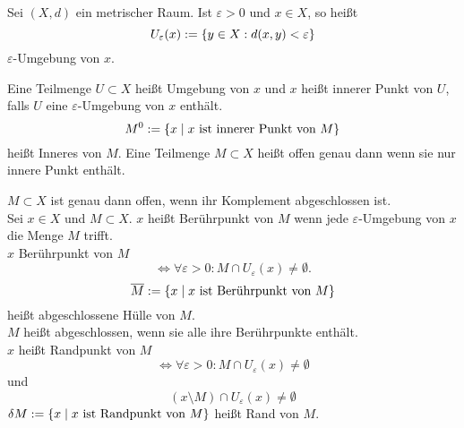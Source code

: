 \documentclass[../ana2u.tex]{subfiles}
\begin{document}
    \begin{defi}
        Sei \((X,d)\) ein metrischer Raum. 
        Ist \( \varepsilon > 0 \) und \( x\in X \), so 
        heißt 
        \[ U_\varepsilon(x) 
        := \{ y \in X: d(x,y) < \varepsilon \} \]
        \( \varepsilon \)-Umgebung von \(x\).
    \end{defi}
    \begin{defi}
        Eine Teilmenge \( U \subset X \) heißt Umgebung 
        von \(x\) und \(x\) heißt innerer Punkt von \(U\), 
        falls \(U\) eine \(\varepsilon \)-Umgebung von \(x\) 
        enthält.
        \[ M^0 := \{x \; \vert \; 
        x \text{ ist innerer Punkt von } M \} \]
        heißt Inneres von \(M\).
        Eine Teilmenge \( M \subset X \) heißt offen genau 
        dann wenn sie nur innere Punkt enthält.
    \end{defi}
    \begin{defi}
        \( M \subset X \) ist genau dann offen, wenn 
        ihr Komplement abgeschlossen ist.\\
        Sei \( x \in X \) und \( M \subset X \). 
        \(x\) heißt Berührpunkt von \(M\) wenn jede 
        \( \varepsilon \)-Umgebung von \(x\) die Menge 
        \(M\) trifft.\\
        \( x \) Berührpunkt von \(M\) 
        \[ \Leftrightarrow \forall \varepsilon > 0: 
        M \cap U_\varepsilon(x) \neq \emptyset. \]
        \[ \overline{M} := \{ x \;\vert \; 
        x \text{ ist Berührpunkt von }M \} \] 
        heißt abgeschlossene Hülle von \(M\).\\
        \( M \) heißt abgeschlossen, wenn sie alle 
        ihre Berührpunkte enthält.\\
        \(x\) heißt Randpunkt von \( M \) 
        \[ \Leftrightarrow \forall \varepsilon > 0 : 
        M \cap U_\varepsilon(x) \neq \emptyset \] 
        und \[ (x \setminus M) \cap U_\varepsilon(x) \neq \emptyset \]
        \( \delta M := \{ x \;\vert\; x 
        \text{ ist Randpunkt von } M \} \) heißt 
        Rand von \(M\).
    \end{defi}
\end{document}
